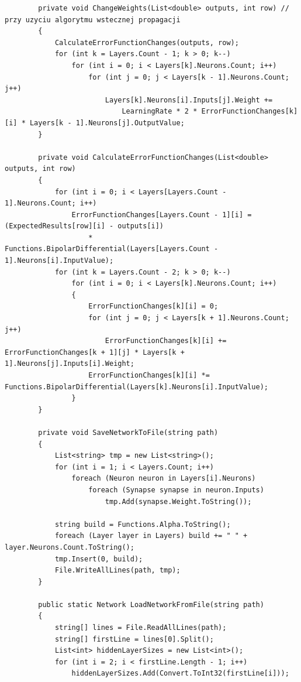 \documentclass[12pt,a4paper]{article}
\begin{document}
\begin{lstlisting}
        private void ChangeWeights(List<double> outputs, int row) // przy uzyciu algorytmu wstecznej propagacji
        {
            CalculateErrorFunctionChanges(outputs, row);
            for (int k = Layers.Count - 1; k > 0; k--)
                for (int i = 0; i < Layers[k].Neurons.Count; i++)
                    for (int j = 0; j < Layers[k - 1].Neurons.Count; j++)
                        Layers[k].Neurons[i].Inputs[j].Weight += 
                            LearningRate * 2 * ErrorFunctionChanges[k][i] * Layers[k - 1].Neurons[j].OutputValue;
        }

        private void CalculateErrorFunctionChanges(List<double> outputs, int row)
        {
            for (int i = 0; i < Layers[Layers.Count - 1].Neurons.Count; i++)
                ErrorFunctionChanges[Layers.Count - 1][i] = (ExpectedResults[row][i] - outputs[i])
                    * Functions.BipolarDifferential(Layers[Layers.Count - 1].Neurons[i].InputValue);
            for (int k = Layers.Count - 2; k > 0; k--)
                for (int i = 0; i < Layers[k].Neurons.Count; i++)
                {
                    ErrorFunctionChanges[k][i] = 0;
                    for (int j = 0; j < Layers[k + 1].Neurons.Count; j++)
                        ErrorFunctionChanges[k][i] += ErrorFunctionChanges[k + 1][j] * Layers[k + 1].Neurons[j].Inputs[i].Weight;
                    ErrorFunctionChanges[k][i] *= Functions.BipolarDifferential(Layers[k].Neurons[i].InputValue);
                }
        }

        private void SaveNetworkToFile(string path)
        {
            List<string> tmp = new List<string>();
            for (int i = 1; i < Layers.Count; i++)
                foreach (Neuron neuron in Layers[i].Neurons)
                    foreach (Synapse synapse in neuron.Inputs)
                        tmp.Add(synapse.Weight.ToString());

            string build = Functions.Alpha.ToString();
            foreach (Layer layer in Layers) build += " " + layer.Neurons.Count.ToString();
            tmp.Insert(0, build);
            File.WriteAllLines(path, tmp);
        }

        public static Network LoadNetworkFromFile(string path)
        {
            string[] lines = File.ReadAllLines(path);
            string[] firstLine = lines[0].Split();
            List<int> hiddenLayerSizes = new List<int>();
            for (int i = 2; i < firstLine.Length - 1; i++)
                hiddenLayerSizes.Add(Convert.ToInt32(firstLine[i]));


\end{lstlisting}
\end{document}
